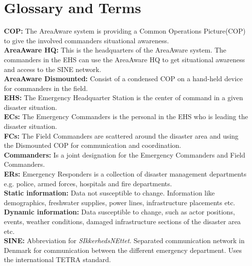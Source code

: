 \appendix
\label{chp_appendix}
\chapter{Glossary and Terms}

\textbf{COP:} The AreaAware system is providing a Common Operations Picture(COP) to give the involved commanders situational awareness.\\

\noindent \textbf{AreaAware HQ:} This is the headquarters of the AreaAware system. The commanders in the EHS can use the AreaAware HQ to get situational awareness and access to the SINE network.\\

\noindent \textbf{AreaAware Dismounted:} Consist of a condensed COP on a hand-held device for commanders in the field.\\

\noindent \textbf{EHS:} The Emergency Headquarter Station is the center of command in a given disaster situation.\\

\noindent \textbf{ECs:} The Emergency Commanders is the personal in the EHS who is leading the disaster situation.\\

\noindent \textbf{FCs:} The Field Commanders are scattered around the disaster area and using the Dismounted COP for communication and coordination.\\

\noindent \textbf{Commanders:} Is a joint designation for the Emergency Commanders and Field Commanders.\\

\noindent \textbf{ERs:} Emergency Responders is a collection of disaster management departments e.g. police, armed forces, hospitals and fire departments.\\

\noindent \textbf{Static information:} Data not susceptible to change. Information like demographics, freshwater supplies, power lines, infrastructure placements etc.\\

\noindent \textbf{Dynamic information:} Data susceptible to change, such as actor positions, events, weather conditions, damaged infrastructure sections of the disaster area etc.\\

\noindent \textbf{SINE:} Abbreviation for \textit{SIkkerhedsNEttet}. Separated communication network in Denmark for communication between the different emergency department. Uses the international TETRA standard.\\